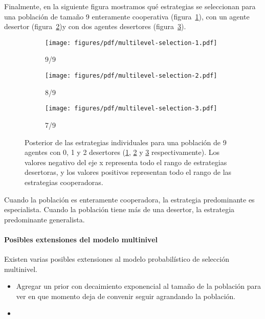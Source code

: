 \documentclass[a4paper,10pt]{article}
\begin{document}

Finalmente, en la siguiente figura mostramos qué estrategias se seleccionan para una población de tamaño 9 enteramente cooperativa (figura~\ref{fig:multilevel-selection-1}), con un agente desertor (figura~\ref{fig:multilevel-selection-2})y con dos agentes desertores (figura~\ref{fig:multilevel-selection-3}).
%
\begin{figure}[H]
    \centering
    \begin{subfigure}[b]{0.32\textwidth}
    \texttt{[image: figures/pdf/multilevel-selection-1.pdf]}
    \caption{9/9}
    \label{fig:multilevel-selection-1}
    \end{subfigure}
    \begin{subfigure}[b]{0.32\textwidth}
    \texttt{[image: figures/pdf/multilevel-selection-2.pdf]}
    \caption{8/9}
    \label{fig:multilevel-selection-2}
    \end{subfigure}
    \begin{subfigure}[b]{0.32\textwidth}
    \texttt{[image: figures/pdf/multilevel-selection-3.pdf]}
    \caption{7/9}
    \label{fig:multilevel-selection-3}
    \end{subfigure}
    \caption{
    Posterior de las estrategias individuales para una población de 9 agentes con 0, 1 y 2 desertores (\ref{fig:multilevel-selection-1}, \ref{fig:multilevel-selection-2} y \ref{fig:multilevel-selection-3} respectivamente).
    Los valores negativo del eje x representa todo el rango de estrategias desertoras, y los valores positivos representan todo el rango de las estrategias cooperadoras.
    }
    \label{fig:multilevel-selection-123}
\end{figure}
%
Cuando la población es enteramente cooperadora, la estrategia predominante es especialista.
Cuando la población tiene más de una desertor, la estrategia predominante generalista.


\paragraph{Posibles extensiones del modelo multinivel} Existen varias posibles extensiones al modelo probabilístico de selección multinivel.
\begin{itemize}
\item Agregar un prior con decaimiento exponencial al tamaño de la población para ver en que momento deja de convenir seguir agrandando la población.
\item 
\end{itemize}
\end{document}
